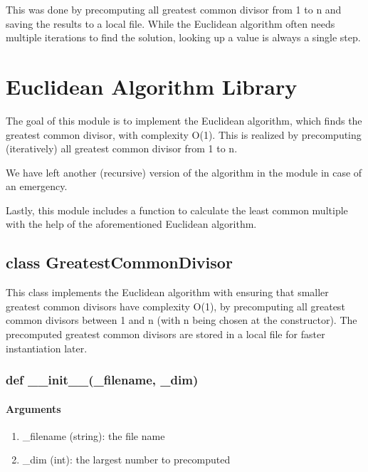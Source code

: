\documentclass[refman]{scrartcl}
\begin{document}
This was done by precomputing all greatest common divisor from 1 to n and saving the results to a local file. While the Euclidean algorithm often needs multiple iterations to find the solution, looking up a value is always a single step.

\section{Euclidean Algorithm Library}

The goal of this module is to implement the Euclidean algorithm, which finds the greatest common divisor, with complexity O(1). This is realized by precomputing (iteratively) all greatest common divisor from 1 to n.

We have left another (recursive) version of the algorithm in the module in case of an emergency.

Lastly, this module includes a function to calculate the least common multiple with the help of the aforementioned Euclidean algorithm.

\subsection{class GreatestCommonDivisor}

This class implements the Euclidean algorithm with ensuring that smaller greatest common divisors have complexity O(1), by precomputing all greatest common divisors between 1 and n (with n being chosen at the constructor). The precomputed greatest common divisors are stored in a local file for faster instantiation later.

\subsubsection{def \_\_init\_\_(\_filename, \_dim)}

\paragraph*{Arguments}

\begin{enumerate}
	\item \_filename (string): the file name
	\item \_dim (int): the largest number to precomputed
\end{enumerate}
\end{document}
